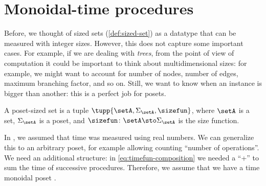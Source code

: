
\section{Monoidal-time procedures}
\label{sec:ProcMod}


Before, we thought of sized sets (\cref{def:sized-set}) as a datatype that can be measured with integer sizes.
However, this does not capture some important cases.
For example, if we are dealing with \emph{trees}, from the point of view of computation it could be important to think about multidimensional sizes: for example, we might want to account for number of nodes, number of edges, maximum branching factor, and so on.
Still, we want to know when an instance is bigger than another: this is a perfect job for posets.

\begin{definition}
	\label{def:poset-sized-set}
	A poset-sized set is a tuple $\tupp{\setA, \Sigma_{\setA}, \sizefun}$, where $\setA$ is a set, $\Sigma_\setA$ is a poset, and  $\sizefun \colon \setA \sto \Sigma_\setA$ is the size function.
\end{definition}

In \ProcSizeTime, we assumed that time was measured using real numbers.
We can generalize this to an arbitrary poset, for example allowing counting ``number of operations''.
We need an additional structure: in \vref{eq:timefun-composition} we needed a ``+'' to sum the time of successive procedures.
Therefore, we assume that we have a time monoidal poset \TimeMonoidal.

